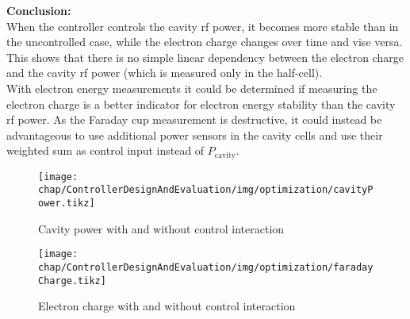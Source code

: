 \textbf{Conclusion:}\\
When the controller controls the cavity \gls{rf} power, it becomes more stable than in the uncontrolled case, while the electron charge changes over time and vise versa. This shows that there is no simple linear dependency between the electron charge and the cavity \gls{rf} power (which is measured only in the half-cell).\\
With electron energy measurements it could be determined if measuring the electron charge is a better indicator for electron energy stability than the cavity \gls{rf} power. As the Faraday cup measurement is destructive, it could instead be advantageous to use additional power sensors in the cavity cells and use their weighted sum as control input instead of $P_\text{cavity}$.

\begin{figure}[tbh]
	\centering
	\texttt{[image: chap/ControllerDesignAndEvaluation/img/optimization/cavityPower.tikz]}
	\caption[Cavity power]{Cavity power with and without control interaction}
	\label{fig:controllerDesignAndEvaluation-optimCav}
	\vspace{2cm}
	\texttt{[image: chap/ControllerDesignAndEvaluation/img/optimization/faradayCharge.tikz]}
	\caption[Electron charge]{Electron charge with and without control interaction}
	\label{fig:controllerDesignAndEvaluation-optimFaraday}
\end{figure}









